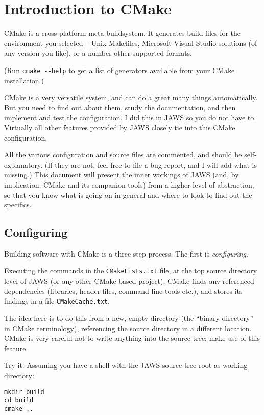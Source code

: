 \section{Introduction to CMake}

CMake is a cross-platform meta-buildsystem. It generates build files for the environment you selected -- Unix Makefiles, Microsoft Visual Studio solutions (of any version you like), or a number other supported formats.

(Run \lstinline{cmake --help} to get a list of generators available from your CMake installation.)

CMake is a very versatile system, and can do a great many things automatically. But you need to find out about them, study the documentation, and then implement and test the configuration. I did this in JAWS so you do not have to. Virtually all other features provided by JAWS closely tie into this CMake configuration.

All the various configuration and source files are commented, and should be self-explanatory. (If they are not, feel free to file a bug report, and I will add what is missing.) This document will present the inner workings of JAWS (and, by implication, CMake and its companion tools) from a higher level of abstraction, so that you know what is going on in general and where to look to find out the specifics.

\subsection{Configuring}

Building software with CMake is a three-step process. The first is \emph{configuring}.

Executing the commands in the \lstinline{CMakeLists.txt} file, at the top source directory level of JAWS (or any other CMake-based project), CMake finds any referenced dependencies (libraries, header files, command line tools etc.), and stores its findings in a file \lstinline{CMakeCache.txt}.

The idea here is to do this from a new, empty directory (the ``binary directory'' in CMake terminology), referencing the source directory in a different location. CMake is very careful not to write anything into the source tree; make use of this feature.

Try it. Assuming you have a shell with the JAWS source tree root as working directory:

\begin{lstlisting}
mkdir build
cd build
cmake ..
\end{lstlisting}

